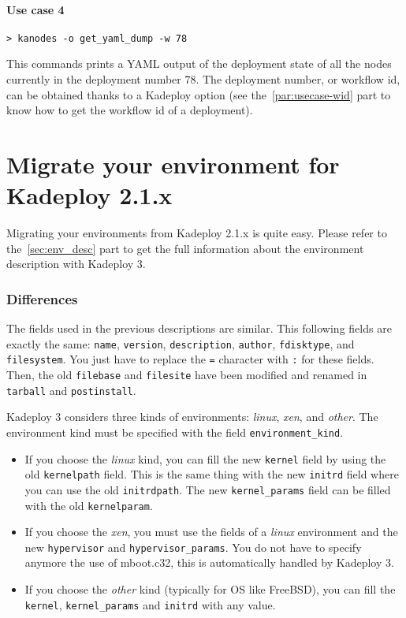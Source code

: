 \documentclass[a4wide,10pt,oneside]{book}
\begin{document}
\paragraph{Use case 4}
\begin{verbatim}
> kanodes -o get_yaml_dump -w 78
\end{verbatim}
This commands prints a YAML output of the deployment state of all the nodes currently in the deployment number 78. The deployment number, or workflow id, can be obtained thanks to a Kadeploy option (see the~\ref{par:usecase-wid} part to know how to get the workflow id of a deployment).

\section{Migrate your environment for Kadeploy 2.1.x}
Migrating your environments from Kadeploy 2.1.x is quite easy. Please refer to the~\ref{sec:env_desc} part to get the full information about the environment description with Kadeploy 3.

\subsubsection{Differences}
The fields used in the previous descriptions are similar. This following fields are exactly the same: \texttt{name}, \texttt{version}, \texttt{description}, \texttt{author}, \texttt{fdisktype}, and \texttt{filesystem}. You just have to replace the \texttt{=} character with \texttt{:} for these fields.
Then, the old \texttt{filebase} and \texttt{filesite} have been modified and renamed in \texttt{tarball} and \texttt{postinstall}.

Kadeploy 3 considers three kinds of environments: \textit{linux}, \textit{xen}, and \textit{other}. The environment kind must be specified with the field \texttt{environment\_kind}.
\begin{itemize}
\item If you choose the \textit{linux} kind, you can fill the new \texttt{kernel} field by using the old \texttt{kernelpath} field. This is the same thing with the new \texttt{initrd} field where you can use the old \texttt{initrdpath}. The new \texttt{kernel\_params} field can be filled with the old \texttt{kernelparam}.
\item If you choose the \textit{xen}, you must use the fields of a \textit{linux} environment and the new \texttt{hypervisor} and \texttt{hypervisor\_params}. You do not have to specify anymore the use of mboot.c32, this is automatically handled by Kadeploy 3.
\item If you choose the \textit{other} kind (typically for OS like FreeBSD), you can fill the \texttt{kernel}, \texttt{kernel\_params} and \texttt{initrd} with any value.
\end{itemize}
\end{document}
